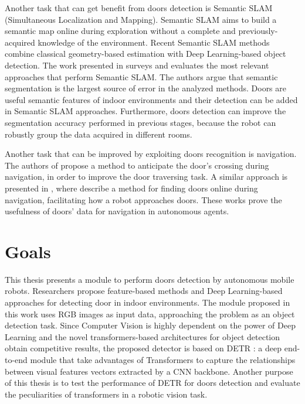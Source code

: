 Another task that can get benefit from doors detection is Semantic SLAM (Simultaneous Localization and Mapping). Semantic SLAM aims to build a semantic map online during exploration without a complete and previously-acquired knowledge of the environment. Recent Semantic SLAM methods combine classical geometry-based estimation with Deep Learning-based object detection. The work presented in \cite{semanticslamsurvey} surveys and evaluates the most relevant approaches that perform Semantic SLAM. The authors argue that semantic segmentation is the largest source of error in the analyzed methods. Doors are useful semantic features of indoor environments and their detection can be added in Semantic SLAM approaches. Furthermore, doors detection can improve the segmentation accuracy performed in previous stages, because the robot can robustly group the data acquired in different rooms. 

Another task that can be improved by exploiting doors recognition is navigation. The authors of \cite{sonarandivisualdoordetection} propose a method to anticipate the door's crossing during navigation, in order to improve the door traversing task. A similar approach is presented in \cite{doorsandnavigation}, where \citeauthor{doorsandnavigation} describe a method for finding doors online during navigation, facilitating how a robot approaches doors. These works prove the usefulness of doors' data for navigation in autonomous agents.

\section{Goals}

This thesis presents a module to perform doors detection by autonomous mobile robots. Researchers propose feature-based methods \cite{sonarandivisualdoordetection, humanoid, edgeandcornerdoorsdetector} and Deep Learning-based approaches \cite{detectdoorsfeature, doorsandnavigation, doorcabinet} for detecting door in indoor environments.  The module proposed in this work uses RGB images as input data, approaching the problem as an object detection task. Since Computer Vision is highly dependent on the power of Deep Learning and the novel transformers-based architectures for object detection obtain competitive results, the proposed detector is based on DETR \cite{detr}: a deep end-to-end module that take advantages of Transformers to capture the relationships between visual features vectors extracted by a CNN backbone. Another purpose of this thesis is to test the performance of DETR for doors detection and evaluate the peculiarities of transformers in a robotic vision task.

